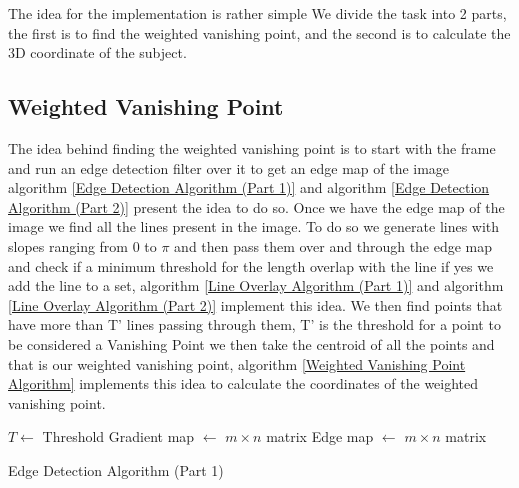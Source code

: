 \documentclass[12pt]{report}
\begin{document}
The idea for the implementation is rather simple We divide the task into 2 parts, the first is to find the weighted vanishing point, and the second is to calculate the 3D coordinate of the subject.\newline

\subsection{Weighted Vanishing Point}

The idea behind finding the weighted vanishing point is to start with the frame and run an edge detection filter over it to get an edge map of the image algorithm \ref{Edge Detection Algorithm (Part 1)} and algorithm \ref{Edge Detection Algorithm (Part 2)} present the idea to do so. Once we have the edge map of the image we find all the lines present in the image. To do so we generate lines with slopes ranging from 0 to $\pi$ and then pass them over and through the edge map and check if a minimum threshold for the length overlap with the line if yes we add the line to a set, algorithm \ref{Line Overlay Algorithm (Part 1)} and algorithm \ref{Line Overlay Algorithm (Part 2)} implement this idea. We then find points that have more than T’ lines passing through them, T’ is the threshold for a point to be considered a Vanishing Point we then take the centroid of all the points and that is our weighted vanishing point, algorithm \ref{Weighted Vanishing Point Algorithm} implements this idea to calculate the coordinates of the weighted vanishing point.

\begin{algorithm}[H]
    \label{Edge Detection Algorithm  (Part 1)}

\SetAlgoLined
    
    $T \leftarrow$ Threshold\;
    Gradient map $\leftarrow$ $m \times n$ matrix\;
    Edge map $\leftarrow$ $m \times n$ matrix\;
    

    \caption{Edge Detection Algorithm  (Part 1)}
\end{algorithm}
\end{document}
